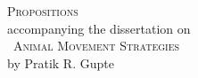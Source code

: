 \begingroup
\thispagestyle{empty}
\clearpage

    \begin{center}
        {\LARGE \scshape{Propositions}} \\
        {\small accompanying the dissertation on}\\
        {\large \adftripleflourishleft~\scshape{Animal Movement Strategies}~\adftripleflourishright}\\
        by Pratik R. Gupte
    \end{center}

\raggedright

